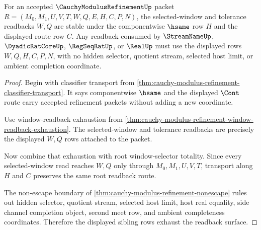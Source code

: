 \begin{theorem}
\label{thm:cauchy-modulus-refinement-root-readback-stability}
For an accepted $\CauchyModulusRefinementUp$ packet $R=(M_0,M_1,U,V,T,W,Q,E,H,C,P,N)$, the selected-window and tolerance readbacks $W,Q$ are stable under the componentwise $\hsame$ row $H$ and the displayed route row $C$. Any readback consumed by $\StreamNameUp$, $\DyadicRatCoreUp$, $\RegSeqRatUp$, or $\RealUp$ must use the displayed rows $W,Q,H,C,P,N$, with no hidden selector, quotient stream, selected host limit, or ambient completion coordinate.
\end{theorem}
\begin{proof}
Begin with classifier transport from \autoref{thm:cauchy-modulus-refinement-classifier-transport}. It says componentwise $\hsame$ and the displayed $\Cont$ route carry accepted refinement packets without adding a new coordinate.

Use window-readback exhaustion from \autoref{thm:cauchy-modulus-refinement-window-readback-exhaustion}. The selected-window and tolerance readbacks are precisely the displayed $W,Q$ rows attached to the packet.

Now combine that exhaustion with root window-selector totality. Since every selected-window read reaches $W,Q$ only through $M_0,M_1,U,V,T$, transport along $H$ and $C$ preserves the same root readback route.

The non-escape boundary of \autoref{thm:cauchy-modulus-refinement-nonescape} rules out hidden selector, quotient stream, selected host limit, host real equality, side channel completion object, second meet row, and ambient completeness coordinates. Therefore the displayed sibling rows exhaust the readback surface.
\end{proof}

